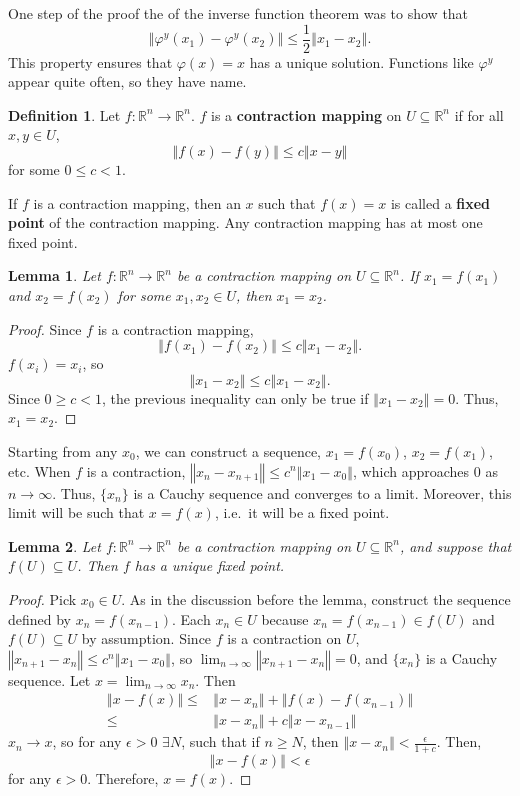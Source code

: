 \documentclass[12pt,reqno]{amsart}
\newtheorem{lemma}{Lemma}[section]
\theoremstyle{definition}
\newtheorem{definition}{Definition}[section]
\def\R{\mathbb{R}}
\newcommand{\norm}[1]{\left\Vert {#1} \right\Vert}
\renewcommand{\to}{{\rightarrow}}
\begin{document}
One step of the proof the of the inverse function theorem was to show that 
\[ \norm{\varphi^y(x_1) - \varphi^y(x_2)} \leq \frac{1}{2} \norm{x_1 - x_2}. \] 
This property ensures that $\varphi(x) = x$ has a unique
solution. Functions like $\varphi^y$ appear quite often, so they have
name.
\begin{definition}
  Let $f:\R^n \to \R^n$. $f$ is a \textbf{contraction mapping} on $U
  \subseteq \R^n$ if for all $x,y \in U$, 
  \[ \norm{f(x) - f(y)} \leq c \norm{x - y} \]
  for some $0 \leq c < 1$.
\end{definition}
If $f$ is a contraction mapping, then an $x$ such that $f(x) = x$ is
called a \textbf{fixed point} of the contraction mapping. Any
contraction mapping has at most one fixed point.
\begin{lemma}
  Let $f:\R^n \to \R^n$ be a contraction mapping on $U \subseteq
  \R^n$. If $x_1 = f(x_1)$ and $x_2 = f(x_2)$ for some $x_1, x_2 \in
  U$, then $x_1 = x_2$.
\end{lemma}
\begin{proof}
  Since $f$ is a contraction mapping, 
  \[ \norm{f(x_1) - f(x_2)} \leq c \norm{x_1 - x_2}. \]
  $f(x_i) = x_i$, so
  \[ \norm{x_1 - x_2} \leq c \norm{x_1 - x_2}. \]
  Since $0 \geq c < 1$, the previous inequality can only be true if
  $\norm{x_1 - x_2} = 0$. Thus, $x_1 = x_2$.
\end{proof}
Starting from any $x_0$, we can construct a sequence, $x_1 = f(x_0)$,
$x_2 = f(x_1)$, etc. When $f$ is a contraction, $\norm{x_n - x_{n+1}}
\leq c^n \norm{x_1 - x_0}$, which approaches $0$ as $n \to
\infty$. Thus, $\{x_n\}$ is a Cauchy sequence and converges to a
limit. Moreover, this limit will be such that $x = f(x)$, i.e.\ it
will be a fixed point. 
\begin{lemma}
  Let $f: \R^n \to \R^n$ be a contraction mapping on $U \subseteq
  \R^n$, and suppose that $f(U) \subseteq U$.  Then $f$ has a unique
  fixed point.
\end{lemma}
\begin{proof}
  Pick $x_0 \in U$. As in the discussion before the lemma, construct
  the sequence defined by $x_n = f(x_{n-1})$. Each $x_n \in U$ because
  $x_n = f(x_{n-1}) \in f(U)$ and $f(U) \subseteq U$ by
  assumption. Since $f$ is a contraction on $U$, $\norm{x_{n+1} - x_{n}}
  \leq c^n \norm{x_1 - x_0}$, so $\lim_{n \to \infty} \norm{x_{n+1} -
    x_{n}} = 0$, and $\{x_n\}$ is a Cauchy sequence. Let $x = \lim_{n
    \to \infty} x_n$. Then 
  \begin{align*}
    \norm{x - f(x)} \leq & \norm{x - x_n} + \norm{f(x) - f(x_{n-1})} \\
    \leq & \norm{x - x_n} + c\norm{x - x_{n-1}}
  \end{align*}
  $x_n \to x$, so for any $\epsilon > 0$ $\exists N$, such that if $n
  \geq N$, then $\norm{x - x_n} < \frac{\epsilon}{1+c}$. Then,
  \[ \norm{x - f(x)} < \epsilon \]
  for any $\epsilon>0$. Therefore, $x = f(x)$. 
\end{proof}
\end{document}
